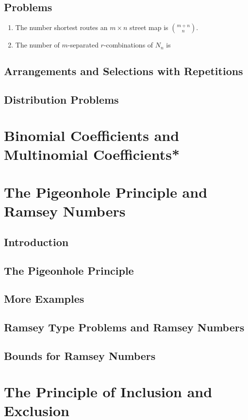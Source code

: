 \subsection*{Problems}
\begin{enumerate}
	\item The number shortest routes an $m \times n$ street map is $\binom{m+n}{n}$.
	\item The number of $m$-separated $r$-combinations of $N_n$ is 
\end{enumerate}
\subsection{Arrangements and Selections with Repetitions}
\subsection{Distribution Problems}

\section{Binomial Coefficients and Multinomial Coefficients*}

\section{The Pigeonhole Principle and Ramsey Numbers}
\subsection{Introduction}
\subsection{The Pigeonhole Principle}
\subsection{More Examples}
\subsection{Ramsey Type Problems and Ramsey Numbers}
\subsection{Bounds for Ramsey Numbers}

\section{The Principle of Inclusion and Exclusion}
